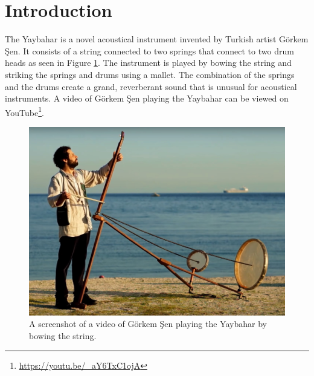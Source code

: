 \documentclass{article}
\title{\papertitle}
\begin{document}
%
\capstartfalse
\maketitle
\capstarttrue
%
\begin{abstract}
In this paper, finite difference schemes (FDSs) are adopted to model a specific instrument, the Yaybahar, invented by Turkish artist Görkem Şen.
Each part of the instrument is simulated independently and its physical behavior is explained in an intuitive yet accurate manner. 
The models are implemented in C++ to form an interactive, real-time application, whose architecture and optimization are discussed.
Code and sound samples are available online.
\end{abstract}
%

\section{Introduction}\label{sec:introduction}
\nocite{Someone:00}

The Yaybahar is a novel acoustical instrument invented by Turkish artist Görkem Şen. It consists of a string connected to two springs that connect to two drum heads as seen in Figure \ref{fig:yaybahar}.
The instrument is played by bowing the string and striking the springs and drums using a mallet.
The combination of the springs and the drums create a grand, reverberant sound that is unusual for acoustical instruments.
A video of Görkem Şen playing the Yaybahar can be viewed on YouTube\footnote{\url{https://youtu.be/_aY6TxC1ojA}\label{fn:videoUrl}}.

\begin{figure}[h]
    \centering
    \includegraphics[width=\linewidth]{yaybahar.jpg}
    \caption{A screenshot of a video 
    of Görkem Şen playing the Yaybahar by bowing the string.}
    \label{fig:yaybahar}
\end{figure}
\end{document}
